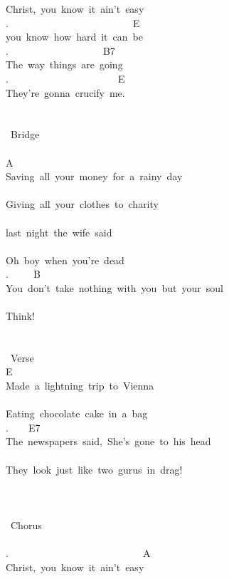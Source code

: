 {Christ,\ you\ know\ it\ ain't\ easy\\
.\ \ \ \ \ \ \ \ \ \ \ \ \ \ \ \ \ \ \ \ \ \ \ \ \ E\\
you\ know\ how\ hard\ it\ can\ be\\
.\ \ \ \ \ \ \ \ \ \ \ \ \ \ \ \ \ \ \ B7\\
The\ way\ things\ are\ going\ \\
.\ \ \ \ \ \ \ \ \ \ \ \ \ \ \ \ \ \ \ \ \ \ E\\
They're\ gonna\ crucify\ me.\\
\\
\\
\lbrack\ Bridge\rbrack\\
\\
A\\
Saving\ all\ your\ money\ for\ a\ rainy\ day\\
\\
Giving\ all\ your\ clothes\ to\ charity\\
\\
last\ night\ the\ wife\ said\\
\\
Oh\ boy\ when\ you're\ dead\\
.\ \ \ \ \ B\ \ \ \ \ \ \ \ \ \ \ \ \ \ \ \ \ \ \ \ \ \ \ \ \ \ \ \ \ \ \ \ \ \\
You\ don't\ take\ nothing\ with\ you\ but\ your\ soul\\
\\
Think!\\
\\
\\
\lbrack\ Verse\rbrack\\
E\\
Made\ a\ lightning\ trip\ to\ Vienna\\
\\
Eating\ chocolate\ cake\ in\ a\ bag\\
.\ \ \ \ E7\\
The\ newspapers\ said,\ \;She's\ gone\ to\ his\ head\\
\\
They\ look\ just\ like\ two\ gurus\ in\ drag!\;\\
\\
\\
\\
\lbrack\ Chorus\rbrack\\
\\
.\ \ \ \ \ \ \ \ \ \ \ \ \ \ \ \ \ \ \ \ \ \ \ \ \ \ \ A\\
Christ,\ you\ know\ it\ ain't\ easy\\
}
